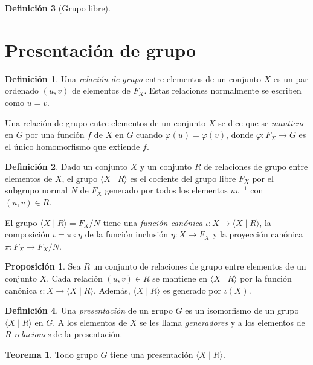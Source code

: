 \documentclass[12pt]{book}
\theoremstyle{definition}
\newtheorem{defi}{Definición}[section]
\newtheorem{teor}{Teorema}[section]
\newtheorem{prop}{Proposición}[section]
\begin{document}
\begin{defi}[Grupo libre]
\section{Presentación de grupo}

\begin{defi}
Una \textit{relación de grupo} entre elementos de un conjunto $X$ es un par ordenado $(u,v)$ de elementos de $F_X$. Estas relaciones normalmente se escriben como $u=v$.
\end{defi}

Una relación de grupo entre elementos de un conjunto $X$ se dice que se \textit{mantiene} en $G$ por una función $f$ de $X$ en $G$ cuando $\varphi(u)=\varphi(v)$, donde $\varphi:F_X\rightarrow G$ es el único homomorfismo que extiende $f$.

\begin{defi}
\label{defi:presen}
Dado un conjunto $X$ y un conjunto $R$ de relaciones de grupo entre elementos de $X$, el grupo $\langle X\mid R \rangle$ es el cociente del grupo libre $F_X$ por el subgrupo normal $N$ de $F_X$ generado por todos los elementos $uv^{-1}$ con $(u,v)\in R$.
\end{defi}

El grupo $\langle X\mid R \rangle = F_X/N$ tiene una \textit{función canónica} $\iota:X\rightarrow \langle X\mid R \rangle$, la composición $\iota =\pi\circ\eta$ de la función inclusión $\eta:X\rightarrow F_X$ y la proyección canónica $\pi:F_X\rightarrow F_X/N$.
\begin{prop}
Sea $R$ un conjunto de relaciones de grupo entre elementos de un conjunto $X$. Cada relación $(u,v)\in R$ se mantiene en $\langle X\mid R \rangle$ por la función canónica $\iota:X\rightarrow\langle X\mid R \rangle$. Además, $\langle X\mid R \rangle$ es generado por $\iota(X)$.
\end{prop}

\end{defi}

\begin{defi}
Una \textit{presentación} de un grupo $G$ es un isomorfismo de un grupo $\langle X\mid R \rangle$ en $G$. A los elementos de $X$ se les llama \textit{generadores} y a los elementos de $R$ \textit{relaciones} de la presentación.
\end{defi}

\begin{teor}
Todo grupo $G$ tiene una presentación $\langle X\mid R \rangle$.
\end{teor}
\end{document}
